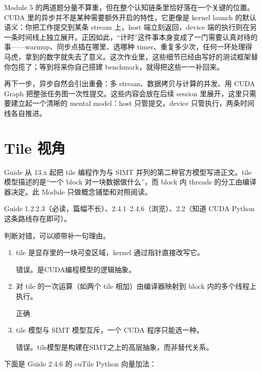 \documentclass[11pt,a4paper,fontset=none]{ctexart}
\begin{document}
\begin{lookback}
Module 5 的两道题分量不算重，但在整个认知链条里恰好落在一个关键的位置。CUDA 里的异步并不是某种需要额外开启的特性，它更像是 kernel launch 的默认语义：你把工作提交到某条 stream 上，host 端立刻返回，device 端的执行则在另一条时间线上独立展开。正因如此，“计时”这件事本身变成了一门需要认真对待的事——warmup、同步点插在哪里、选哪种 timer、重复多少次，任何一环处理得马虎，拿到的数字就失去了意义。这次作业里，这些细节已经由写好的测试框架替你包揽了；等到将来你自己搭建 benchmark，就得把这些一一补回来。

再下一步，异步自然会引出重叠：多 stream、数据拷贝与计算的并发、用 CUDA Graph 把整张任务图一次性提交。这些内容会放在后续 session 里展开，这里只需要建立起一个清晰的 mental model：host 只管提交，device 只管执行，两条时间线各自推进。
\end{lookback}

\section{Tile 视角}

Guide 从 13.x 起把 tile 编程作为与 SIMT 并列的第二种官方模型写进正文。tile 模型描述的是“一个 block 对一块数据做什么”，而 block 内 threads 的分工由编译器决定。此 Module 只做概念铺垫和对照阅读。

\begin{reading}
Guide 1.2.2.3（必读，篇幅不长）、2.4.1--2.4.6（浏览）、2.2（知道 CUDA Python 这条路线存在即可）。
\end{reading}

判断对错，可以顺带补一句理由。
\begin{enumerate}[label=(\alph*)]
  \item tile 是显存里的一块可变区域，kernel 通过指针直接改写它。

  错误。是CUDA编程模型的逻辑抽象。

  \item 对 tile 的一次运算（如两个 tile 相加）由编译器映射到 block 内的多个线程上执行。

  正确

  \item tile 模型与 SIMT 模型互斥，一个 CUDA 程序只能选一种。

  错误。tile模型是构建在SIMT之上的高层抽象，而非替代关系。

\end{enumerate}

下面是 Guide 2.4.6 的 cuTile Python 向量加法：
\end{document}

